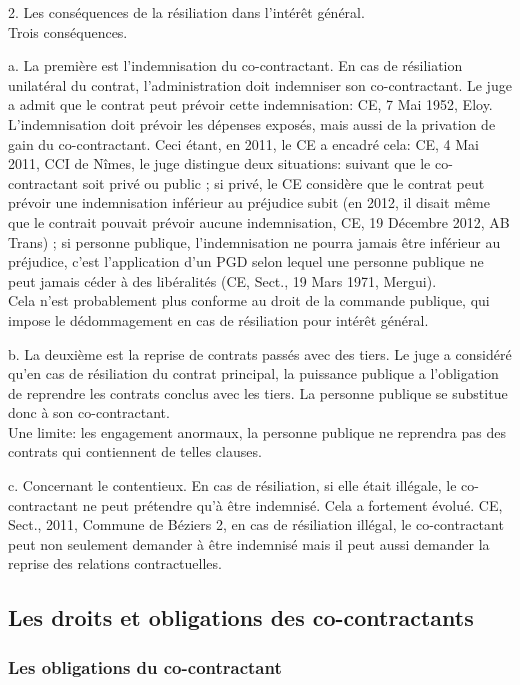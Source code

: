 \documentclass[10pt, a4paper, openany]{book}
\begin{document}
2. Les conséquences de la résiliation dans l'intérêt général. \\
Trois conséquences.


a. La première est l'indemnisation du co-contractant. En cas de résiliation unilatéral du contrat, l'administration doit indemniser son co-contractant. Le juge a admit que le contrat peut prévoir cette indemnisation: CE, 7 Mai 1952, Eloy. L'indemnisation doit prévoir les dépenses exposés, mais aussi de la privation de gain du co-contractant. Ceci étant, en 2011, le CE a encadré cela: CE, 4 Mai 2011, CCI de Nîmes, le juge distingue deux situations: suivant que le co-contractant soit privé ou public ; si privé, le CE considère que le contrat peut prévoir une indemnisation inférieur au préjudice subit (en 2012, il disait même que le contrait pouvait prévoir aucune indemnisation, CE, 19 Décembre 2012, AB Trans) ; si personne publique, l'indemnisation ne pourra jamais être inférieur au préjudice, c'est l'application d'un PGD selon lequel une personne publique ne peut jamais céder à des libéralités (CE, Sect., 19 Mars 1971, Mergui). \\
Cela n'est probablement plus conforme au droit de la commande publique, qui impose le dédommagement en cas de résiliation pour intérêt général.


b. La deuxième est la reprise de contrats passés avec des tiers. Le juge a considéré qu'en cas de résiliation du contrat principal, la puissance publique a l'obligation de reprendre les contrats conclus avec les tiers. La personne publique se substitue donc à son co-contractant. \\
Une limite: les engagement anormaux, la personne publique ne reprendra pas des contrats qui contiennent de telles clauses. 


c. Concernant le contentieux. En cas de résiliation, si elle était illégale, le co-contractant ne peut prétendre qu'à être indemnisé. Cela a fortement évolué. CE, Sect., 2011, Commune de Béziers 2, en cas de résiliation illégal, le co-contractant peut non seulement demander à être indemnisé mais il peut aussi demander la reprise des relations contractuelles. 

\subsection{Les droits et obligations des co-contractants}

\subsubsection{Les obligations du co-contractant}
\end{document}
